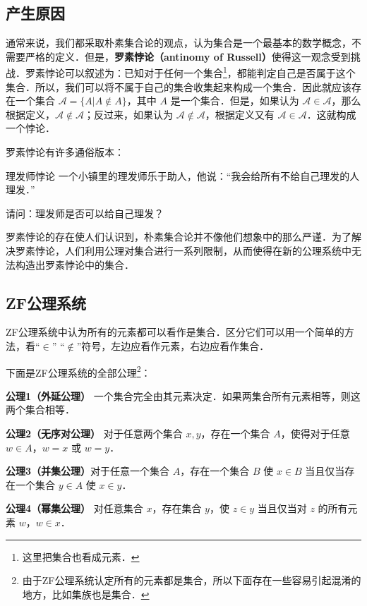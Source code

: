 \begin{issues}
\issueDraft
\end{issues}

\subsection{产生原因}
通常来说，我们都采取朴素集合论的观点，认为集合是一个最基本的数学概念，不需要严格的定义．但是，\textbf{罗素悖论（antinomy of Russell）}使得这一观念受到挑战．罗素悖论可以叙述为：已知对于任何一个集合\footnote{这里把集合也看成元素．}，都能判定自己是否属于这个集合．所以，我们可以将不属于自己的集合收集起来构成一个集合．因此就应该存在一个集合 $\mathcal{A}=\{A|A\notin A\}$，其中 $A$ 是一个集合．但是，如果认为 $\mathcal{A}\in\mathcal{A}$，那么根据定义，$\mathcal{A}\notin\mathcal{A}$；反过来，如果认为 $\mathcal{A}\notin\mathcal{A}$，根据定义又有 $\mathcal{A}\in\mathcal{A}$．这就构成一个悖论．

罗素悖论有许多通俗版本：
\begin{example}{理发师悖论}
一个小镇里的理发师乐于助人，他说：“我会给所有不给自己理发的人理发．”

请问：理发师是否可以给自己理发？
\end{example}

罗素悖论的存在使人们认识到，朴素集合论并不像他们想象中的那么严谨．为了解决罗素悖论，人们利用公理对集合进行一系列限制，从而使得在新的公理系统中无法构造出罗素悖论中的集合．

\subsection{ZF公理系统}
ZF公理系统中认为所有的元素都可以看作是集合．区分它们可以用一个简单的方法，看“$\in$” “$\notin$”符号，左边应看作元素，右边应看作集合．

下面是ZF公理系统的全部公理\footnote{由于ZF公理系统认定所有的元素都是集合，所以下面存在一些容易引起混淆的地方，比如集族也是集合．}：

\textbf{公理1（外延公理）} 一个集合完全由其元素决定．如果两集合所有元素相等，则这两个集合相等．

\textbf{公理2（无序对公理）} 对于任意两个集合 $x,y$，存在一个集合 $A$，使得对于任意 $w\in A$，$w=x$ 或 $w=y$．

\textbf{公理3（并集公理）}对于任意一个集合 $A$，存在一个集合 $B$ 使 $x\in B$ 当且仅当存在一个集合 $y\in A$ 使 $x\in y$．

\textbf{公理4（幂集公理）} 对任意集合 $x$，存在集合 $y$，使 $z\in y$ 当且仅当对 $z$ 的所有元素 $w$，$w\in x$．

